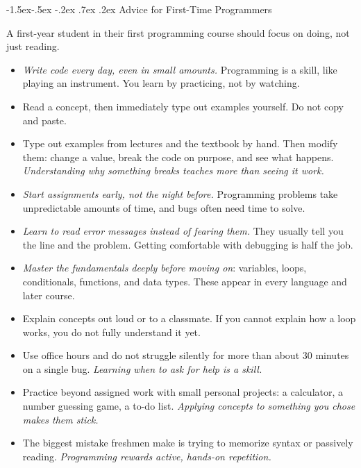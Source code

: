 \documentclass[12pt,twocolumn]{amsart}
\makeatletter
\renewcommand\section{\@startsection{section}{1}%
  \z@
  {-1.5ex\@plus -.5ex \@minus -.2ex}%
  {.7ex \@plus .2ex}%
  {\normalfont\large\bfseries}}
\makeatother
\begin{document}
\section{Advice for First-Time Programmers}

A first-year student in their first programming course should focus on doing, not just reading.

\begin{itemize}
	
	\item
	\emph{Write code every day, even in small amounts.} 
	Programming is a skill, like playing an instrument. 
	You learn by practicing, not by watching.
	
	\item
	Read a concept, then immediately type out examples yourself. 
	Do not copy and paste.
	
	\item
	Type out examples from lectures and the textbook by hand. 
	Then modify them: change a value, break the code on purpose, and see what happens. 
	\emph{Understanding why something breaks teaches more than seeing it work.}
	
	\item
	\emph{Start assignments early, not the night before.} 
	Programming problems take unpredictable amounts of time, and bugs often need time to solve.
	
	\item
	\emph{Learn to read error messages instead of fearing them.} 
	They usually tell you the line and the problem. 
	Getting comfortable with debugging is half the job.
	
	\item
	\emph{Master the fundamentals deeply before moving on}: 
	variables, loops, conditionals, functions, and data types. 
	These appear in every language and later course.
	
	\item
	Explain concepts out loud or to a classmate. 
	If you cannot explain how a loop works, you do not fully understand it yet.
	
	\item
	Use office hours and do not struggle silently for more than about 30 minutes on a single bug. 
	\emph{Learning when to ask for help is a skill.}
	
	\item
	Practice beyond assigned work with small personal projects: 
	a calculator, a number guessing game, a to-do list. 
	\emph{Applying concepts to something you chose makes them stick.}
	
	\item
	The biggest mistake freshmen make is trying to memorize syntax or passively reading. 
	\emph{Programming rewards active, hands-on repetition.}

\end{itemize}
\end{document}
